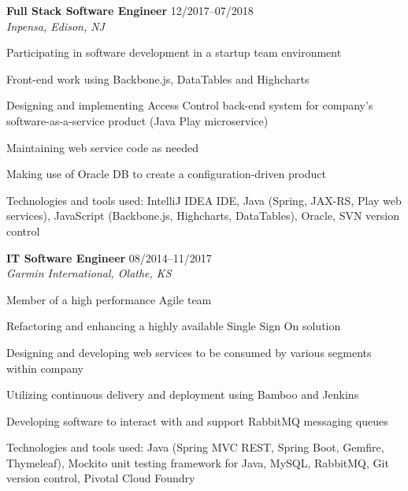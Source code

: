 \begin{itemize1}
	\item \textbf{Full Stack Software Engineer} \textopenbullet{} 12/2017--07/2018 \\
		\textit{Inpensa, Edison, NJ} \vspace{-1.5mm}
		\begin{itemize1}
			\item Participating in software development in a startup team environment
			\item Front-end work using Backbone.js, DataTables and Highcharts
			\item Designing and implementing Access Control back-end system for company's software-as-a-service product (Java Play microservice)
			\item Maintaining web service code as needed
			\item Making use of Oracle DB to create a configuration-driven product
			\item Technologies and tools used: IntelliJ IDEA IDE, Java (Spring, JAX-RS, Play web services), JavaScript (Backbone.js, Highcharts, DataTables), Oracle, SVN version control
		\end{itemize1}
\end{itemize1}

\begin{itemize1}
	\item \textbf{IT Software Engineer} \textopenbullet{} 08/2014--11/2017 \\
		\textit{Garmin International, Olathe, KS} \vspace{-1.5mm}
		\begin{itemize1}
			\item Member of a high performance Agile team
			\item Refactoring and enhancing a highly available Single Sign On solution
			\item Designing and developing web services to be consumed by various segments within company
			\item Utilizing continuous delivery and deployment using Bamboo and Jenkins
			\item Developing software to interact with and support RabbitMQ messaging queues 
			\item Technologies and tools used: Java (Spring MVC REST, Spring Boot, Gemfire, Thymeleaf), Mockito unit testing framework for Java, MySQL, RabbitMQ, Git version control, Pivotal Cloud Foundry
		\end{itemize1}
\end{itemize1}

